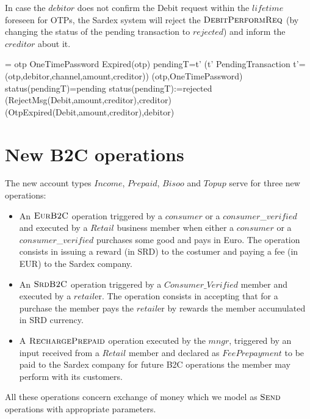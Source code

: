 In case the $debitor$ does not confirm the Debit request within the $lifetime$ foreseen for OTPs, the Sardex system will reject the $\hbox{\sc DebitPerformReq}$ (by changing the status of the pending transaction to $rejected$) and inform the $creditor$ about it.

\begin{asm}  
 =\+           
  \IF otp \in OneTimePassword \AND Expired(otp)  \THEN \+
  \LET pendingT=\iota t' (t'  \in PendingTransaction \AND 
       t'=(otp,debitor,channel,amount,creditor))\+
       (otp,OneTimePassword) \\
      \IF status(pendingT)=pending \THEN \+
         status(pendingT):=rejected\\
         (RejectMsg(Debit,amount,creditor),\TO creditor)\\  
         (OtpExpired(Debit,amount,creditor),\TO debitor)  
\end{asm}

\section{New B2C operations}
\label{sect:userops}

The new account types $Income$, $Prepaid$, $Bisoo$ and $Topup$ serve for three new operations:
\begin{itemize}
	\item An $\hbox{\sc EurB2C}$ operation triggered by a $consumer$ or a $consumer$\_$verified$ and executed by a $Retail$ business member when either a $consumer$ or a $consumer$\_$verified$ purchases some good and pays in Euro. The operation consists in issuing a reward (in SRD) to the costumer and paying a fee (in EUR) to the Sardex company.
		
	\item An $\hbox{\sc SrdB2C}$ operation triggered by a $Consumer\_Verified$ member and executed by a $retail$er. The operation consists in accepting that for a purchase the member pays the $retail$er by rewards the member accumulated in SRD currency. 
	
	\item  A $\hbox{\sc RechargePrepaid}$ operation executed by the $mngr$, triggered by an input received from a $Retail$ member and declared as $FeePrepayment$ to be paid to the Sardex company for future B2C operations the member may perform with its customers.
	\end{itemize}
All these operations concern exchange of money which we model as $\hbox{\sc Send}$ operations with appropriate parameters.


